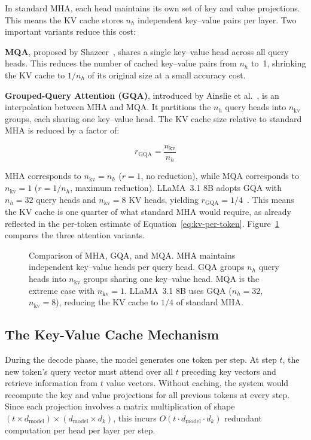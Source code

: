 \documentclass[
english,                 %
bibtex,                  %
]{kththesis}
\numberwithin{listing}{chapter}
\begin{document}
In standard MHA, each head maintains its own set of key and value projections. This means the \gls{KV} cache stores $n_h$ independent key--value pairs per layer. Two important variants reduce this cost:

\textbf{\gls{MQA}}, proposed by Shazeer~\cite{shazeer2019fast}, shares a single key--value head across all query heads. This reduces the number of cached key--value pairs from $n_h$ to~1, shrinking the \gls{KV} cache to $1/n_h$ of its original size at a small accuracy cost.

\textbf{Grouped-Query Attention (GQA)}, introduced by Ainslie et al.~\cite{ainslie2023gqa}, is an interpolation between MHA and MQA. It partitions the $n_h$ query heads into $n_{\text{kv}}$ groups, each sharing one key--value head. The \gls{KV} cache size relative to standard MHA is reduced by a factor of:

\begin{equation}
\label{eq:gqa-ratio}
r_{\text{GQA}} = \frac{n_{\text{kv}}}{n_h}
\end{equation}

\noindent MHA corresponds to $n_{\text{kv}} = n_h$ ($r = 1$, no reduction), while MQA corresponds to $n_{\text{kv}} = 1$ ($r = 1/n_h$, maximum reduction). LLaMA~3.1 8B adopts GQA with $n_h = 32$ query heads and $n_{\text{kv}} = 8$ \gls{KV} heads, yielding $r_{\text{GQA}} = 1/4$~\cite{dubey2024llama3}. This means the \gls{KV} cache is one quarter of what standard MHA would require, as already reflected in the per-token estimate of Equation~\ref{eq:kv-per-token}. Figure~\ref{fig:mha-gqa-mqa} compares the three attention variants.


\begin{figure}[H]
  \centering
  \resizebox{\textwidth}{!}{}
  \caption{Comparison of MHA, GQA, and MQA. MHA maintains independent key--value heads per query head. GQA groups $n_h$ query heads into $n_{\text{kv}}$ groups sharing one key--value head. MQA is the extreme case with $n_{\text{kv}}=1$. LLaMA~3.1 8B uses GQA ($n_h=32$, $n_{\text{kv}}=8$), reducing the \gls{KV} cache to $1/4$ of standard MHA.}
  \label{fig:mha-gqa-mqa}
\end{figure}

\subsection{The Key-Value Cache Mechanism}
\label{sec:bg-kv-cache}

During the decode phase, the model generates one token per step. At step $t$, the new token's query vector must attend over all $t$ preceding key vectors and retrieve information from $t$ value vectors. Without caching, the system would recompute the key and value projections for all previous tokens at every step. Since each projection involves a matrix multiplication of shape $(t \times d_{\text{model}}) \times (d_{\text{model}} \times d_k)$, this incurs $O(t \cdot d_{\text{model}} \cdot d_k)$ redundant computation per head per layer per step.
\end{document}
